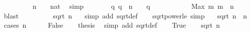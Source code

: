 \begin{isabellebody}
\ \ \ \ \isamarkupfalse%
\ \isamarkupfalse%
\ {\isachardoublequoteopen}{}\ {\isasymle}\ n\ {\isasymand}\ {}\ {\isacharless}\ {\isacharparenleft}{}{\isacharcolon}{\isacharcolon}nat{\isacharparenright}{\isachardoublequoteclose}\ \isamarkupfalse%
\ simp\isanewline
\ \ \ \ \isamarkupfalse%
\ \isamarkupfalse%
\ {\isachardoublequoteopen}{\isasymexists}q{\isachardot}\ q\ {\isasymle}\ n\ {\isasymand}\ {}\ {\isacharless}\ q{\isachardoublequoteclose}\ \isacommand{{\isachardot}{\isachardot}}\isamarkupfalse%
\isanewline
\ \ \ \ \isamarkupfalse%
\ {\isacharasterisk}\ \isamarkupfalse%
\ {\isachardoublequoteopen}{}\ {\isacharless}\ Max\ {\isacharbraceleft}m{\isachardot}\ m\ {\isasymle}\ n{\isacharbraceright}{\isachardoublequoteclose}\ \isamarkupfalse%
\ blast\isanewline
\ \ \ \ \isamarkupfalse%
\ \isamarkupfalse%
\ {\isachardoublequoteopen}{}\ {\isacharless}\ sqrt\ n{\isachardoublequoteclose}\ \isamarkupfalse%
\ \ {\isacharparenleft}simp\ add{\isacharcolon}\ sqrt{\isacharunderscore}def{\isacharparenright}\isanewline
\ \ \isamarkupfalse%
\isanewline
{}\isamarkupfalse%
%
\endisatagproof
{\isafoldproof}%
%
\isadelimproof
\isanewline
%
\endisadelimproof
\isanewline
{}\isamarkupfalse%
\ sqrt{\isacharunderscore}power{}{\isacharunderscore}le\ {\isacharbrackleft}simp{\isacharbrackright}{\isacharcolon}\ \isanewline
\ \ {\isachardoublequoteopen}{\isacharparenleft}sqrt\ n{\isacharparenright}\ {\isasymle}\ n{\isachardoublequoteclose}\isanewline
%
\isadelimproof
%
\endisadelimproof
%
\isatagproof
{}\isamarkupfalse%
\ {\isacharparenleft}cases\ {\isachardoublequoteopen}n\ {\isachargreater}\ {}{\isachardoublequoteclose}{\isacharparenright}\isanewline
\ \ \isamarkupfalse%
\ False\ \isamarkupfalse%
\ \isamarkupfalse%
\ {\isacharquery}thesis\ \isamarkupfalse%
\ {\isacharparenleft}simp\ add{\isacharcolon}\ sqrt{\isacharunderscore}def{\isacharparenright}\isanewline
{}\isamarkupfalse%
\isanewline
\ \ \isamarkupfalse%
\ True\ \isamarkupfalse%
\ \isamarkupfalse%
\ {\isachardoublequoteopen}sqrt\ n\ {\isachargreater}\ {}{\isachardoublequoteclose}\ \isamarkupfalse%

\end{isabellebody}
